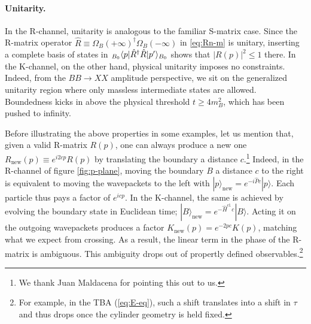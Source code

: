 \documentclass[
 reprint,
 amsmath,
 pre,
 amssymb,
 nofootinbib,
 aps,
 longbibliography,
]{revtex4-1}
\newcommand{\<}{{\langle}}
\renewcommand{\>}{{\rangle}}
\begin{document}
\paragraph{Unitarity.} In the R-channel, unitarity is analogous to the familiar S-matrix case. Since the R-matrix operator $\hat R\equiv \Omega_B(+\infty)^\dagger \Omega_B(-\infty)$ in \eqref{eq:Rn-m} is unitary, inserting a complete basis of states in
${}_{\hspace{0.8pt}B_0} \langle p | \hat R^\dagger \hat R | p'\rangle_{B_0}$
shows that $|R(p)|^2 \leq 1$ there. In the K-channel, on the other hand, physical unitarity imposes no constraints. Indeed, from the $BB\to XX$ amplitude perspective, we sit on the generalized unitarity region where only massless intermediate states are allowed.
Boundedness kicks in above the physical threshold $t\geq 4m_B^2$, which has been pushed to infinity.

Before illustrating the above properties in some examples, let us mention that, given a valid R-matrix $R(p)$, one can always produce a new one $R_{\text{new}}(p)\equiv e^{i 2c p} R(p)$ by translating the boundary a distance $c$.\footnote{We thank Juan Maldacena for pointing this out to us.} Indeed, in the R-channel of figure \ref{fig:p-plane}, moving the boundary $B$ a distance $c$ to the right is equivalent to moving the wavepackets to the left with $|p\rangle_\text{new} = e^{-i \hat P c}|p\rangle$. Each particle thus pays a factor of $e^{icp}$. In the K-channel, the same is achieved by evolving the boundary state in Euclidean time; $|B\rangle_\text{new} = e^{-\hat H^\text{cl.} c}|B\rangle$. Acting it on the outgoing wavepackets produces a factor $K_\text{new}(p) = e^{-2pc}K(p)$, matching what we expect from crossing. As a result, the linear term in the phase of the R-matrix is ambiguous. This ambiguity drops out of propertly defined observables.\footnote{For example, in the TBA (\ref{eq:E-eq}), such a shift translates into a shift in $\tau$ and thus drops once the cylinder geometry is held fixed.}
\end{document}
